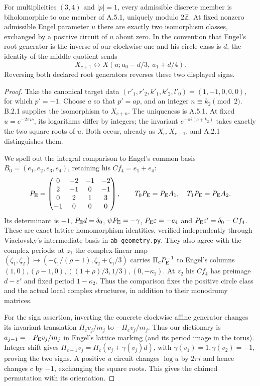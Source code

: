 \begin{proposition}[B.2.2; Proved]\label{st:B.2.2}
For multiplicities $(3,4)$ and $|p|=1$, every admissible discrete member is biholomorphic to one member of A.5.1, uniquely modulo $2\mathbb Z$. At fixed nonzero admissible Engel parameter $u$ there are exactly two isomorphism classes, exchanged by a positive circuit of $u$ about zero. In the convention that Engel's root generator is the inverse of our clockwise one and his circle class is $d$, the identity of the middle quotient sends
\[
 X_{c+1}\longleftrightarrow X(u;a_0-d/3,\ a_1+d/4).
\]
Reversing both declared root generators reverses these two displayed signs.
\end{proposition}
\begin{proof}
Take the canonical target data $(r'_1,r'_2,k'_1,k'_2,l'_0)=(1,-1,0,0,0)$, for which $p'=-1$. Choose $a$ so that $p'=ap$, and an integer $n\equiv k_2\pmod2$. B.2.1 supplies the isomorphism to $X_{c+n}$. The uniqueness is A.5.1. At fixed $u=e^{-2\pi ic}$, its logarithms differ by integers; the invariant $e^{-\pi i(c+k_2)}$ takes exactly the two square roots of $u$. Both occur, already as $X_c,X_{c+1}$, and A.2.1 distinguishes them.

We spell out the integral comparison to Engel's common basis $B_0=(e_1,e_2,e_3,e_4)$, retaining his $C f_4=e_1+e_4$:
\[
 P_{\rm E}=\begin{pmatrix}0&-2&-1&-2\\2&-1&0&-1\\0&2&1&3\\-1&0&0&0\end{pmatrix},\qquad
 T_0P_{\rm E}=P_{\rm E}A_1,\quad T_1P_{\rm E}=P_{\rm E}A_2.
\]
Its determinant is $-1$, $P_{\rm E}d=\delta_0$, $\psi P_{\rm E}=-\gamma$, $P_{\rm E}\varepsilon=-e_4$ and $P_{\rm E}\varepsilon'=\delta_0-Cf_4$. These are exact lattice homomorphism identities, verified independently through Viaclovsky's intermediate basis in \texttt{ab\_geometry.py}. They also agree with the complex periods: at $z_1$ the complex-linear map
$(\zeta_1,\zeta_2)\mapsto(-\zeta_1/(\rho+1),\zeta_2+\zeta_1/3)$ carries $\Pi_cP_{\rm E}^{-1}$ to Engel's columns $(1,0),(\rho-1,0),((1+\rho)/3,1/3),(0,-\kappa_1)$. At $z_2$ his $Cf_4$ has preimage $d-\varepsilon'$ and fixed period $1-\kappa_2$. Thus the comparison fixes the positive circle class and the actual local complex structures, in addition to their monodromy matrices.

For the sign assertion, inverting the concrete clockwise affine generator changes its invariant translation $\Pi_cv_j/m_j$ to $-\Pi_cv_j/m_j$. Thus our dictionary is $a_{j-1}=-P_{\rm E}v_j/m_j$ in Engel's lattice marking (and its period image in the torus). Integer shift gives $\Pi_{c+1}v_j=\Pi_c(v_j+\gamma(v_j)d)$, with $\gamma(v_1)=1,\gamma(v_2)=-1$, proving the two signs. A positive $u$ circuit changes $\log u$ by $2\pi i$ and hence changes $c$ by $-1$, exchanging the square roots. This gives the claimed permutation with its orientation.
\end{proof}

